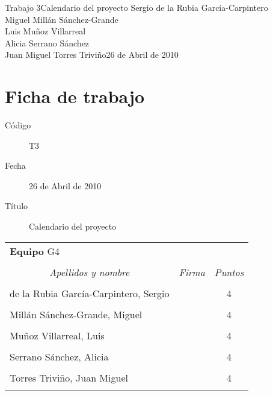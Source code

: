 \documentclass[11pt,a4paper,spanish,twoside]{report}
\begin{document}


{Trabajo 3}{Calendario del proyecto}
{Sergio de la Rubia García-Carpintero\\Miguel Millán Sánchez-Grande\\
  Luis Muñoz Villarreal\\Alicia Serrano Sánchez\\
  Juan Miguel Torres Triviño}{26 de Abril de 2010}


\chapter*{Ficha de trabajo}
\begin{description}
\item[Código] T3
\item[Fecha] 26 de Abril de 2010
\item[Título] Calendario del proyecto
\end{description}

\begin{table}[!ht]
  \centering
  \begin{tabular}{lp{5cm}c}
    \multicolumn{3}{l}{\Large \textbf{Equipo} G4} \\ \\
    \multicolumn{1}{c}{\emph{Apellidos y nombre}} & 
    \multicolumn{1}{c}{\emph{Firma}} & \emph{Puntos} \\
    \hline \\
    de la Rubia García-Carpintero, Sergio & & 4 \\ \\
    Millán Sánchez-Grande, Miguel         & & 4 \\ \\
    Muñoz Villarreal, Luis                & & 4 \\ \\
    Serrano Sánchez, Alicia               & & 4 \\ \\
    Torres Triviño, Juan Miguel           & & 4 \\ \\
    \hline
  \end{tabular}
\end{table}
\end{document}
